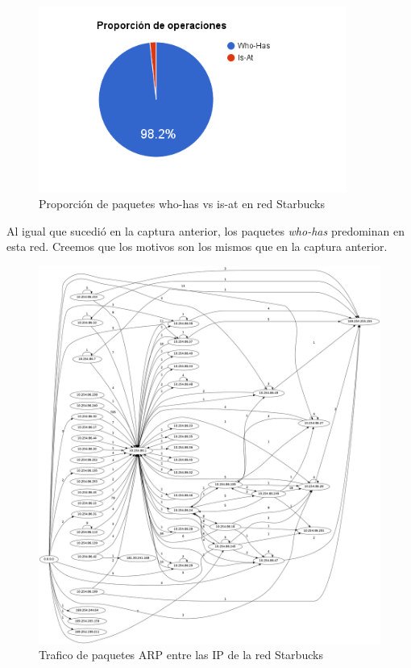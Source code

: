 \begin{figure}[H]
  \centering
    \includegraphics[width=0.9\textwidth]{imagenes/starbucks/proporcion_paquetes_arp.png}
  \caption{Proporción de paquetes who-has vs is-at en red Starbucks}
  \label{fig:ejemplo}
\end{figure}

Al igual que sucedió en la captura anterior, los paquetes \textit{who-has} predominan en esta red. Creemos que los motivos son los mismos que en la captura anterior.

\begin{figure}[H]
  \centering
    \includegraphics[width=1.2\textwidth]{imagenes/starbucks/digrafo_starbucks.png}
  \caption{Trafico de paquetes ARP entre las IP de la red Starbucks}
  \label{fig:ejemplo}
\end{figure}


